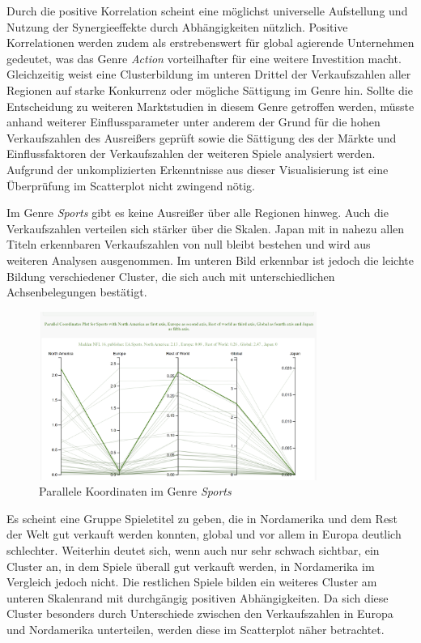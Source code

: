 \documentclass[usegeometry=true]{scrartcl}
\begin{document}
Durch die positive Korrelation scheint eine möglichst universelle Aufstellung und Nutzung der Synergieeffekte durch Abhängigkeiten nützlich.
Positive Korrelationen werden zudem als erstrebenswert für global agierende Unternehmen gedeutet, was das Genre \textit{Action} vorteilhafter für eine weitere Investition macht.
Gleichzeitig weist eine Clusterbildung im unteren Drittel der Verkaufszahlen aller Regionen auf starke Konkurrenz oder mögliche Sättigung im Genre hin. 
Sollte die Entscheidung zu weiteren Marktstudien in diesem Genre getroffen werden, 
müsste anhand weiterer Einflussparameter unter anderem der Grund für die hohen Verkaufszahlen des Ausreißers geprüft sowie die Sättigung des der Märkte und Einflussfaktoren der Verkaufszahlen der weiteren Spiele analysiert werden.
Aufgrund der unkomplizierten Erkenntnisse aus dieser Visualisierung ist eine Überprüfung im Scatterplot nicht zwingend nötig.

Im Genre \textit{Sports} gibt es keine Ausreißer über alle Regionen hinweg. Auch die Verkaufszahlen verteilen sich stärker über die Skalen. 
Japan mit in nahezu allen Titeln erkennbaren Verkaufszahlen von null bleibt bestehen und wird aus weiteren Analysen ausgenommen.
Im unteren Bild erkennbar ist jedoch die leichte Bildung verschiedener Cluster, die sich auch mit unterschiedlichen Achsenbelegungen bestätigt.
\begin{figure}[h]
        \centering
        \includegraphics[height=5.5cm]{Bilder/ParallelPlot_Sports.png}
        \caption{Parallele Koordinaten im Genre \textit{Sports}}
        \label{fig:ParallelPlotSports}
\end{figure}
Es scheint eine Gruppe Spieletitel zu geben, die in Nordamerika und dem Rest der Welt gut verkauft werden konnten, global und vor allem in Europa deutlich schlechter.
Weiterhin deutet sich, wenn auch nur sehr schwach sichtbar, ein Cluster an, in dem Spiele überall gut verkauft werden, in Nordamerika im Vergleich jedoch nicht.
Die restlichen Spiele bilden ein weiteres Cluster am unteren Skalenrand mit durchgängig positiven Abhängigkeiten. 
Da sich diese Cluster besonders durch Unterschiede zwischen den Verkaufszahlen in Europa und Nordamerika unterteilen, werden diese im Scatterplot näher betrachtet. 
\end{document}
